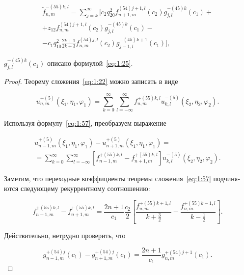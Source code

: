 \begin{russian}
\begin{theorem}
\begin{multline}\label{eq:1:56}
\tilde f_{n,m}^{ - (55)k,l} = \sum\limits_{j = k}^\infty  \bigg[ {c_2}q_{20}^2f_{n + 1,m}^{(54)j + 1,l}({c_2})g_{j,l}^{ - (45)k}({c_1}) + \\ 
+ {z_{12}}f_{n,m}^{(54)j + 1,l}({c_2})g_{j,l}^{ - (45)k}({c_1}) - \\
- {c_1}q_{10}^2\frac{{2k + 1}}{{2k + 3}}f_{n,m}^{(54)j,l}({c_2})g_{j - 1,l}^{ - (45)k + 1}({c_1}) \bigg],
\end{multline}

\noindent $g_{j,l}^{ - (45)k}({c_1})$ описано формулой~\eqref{eq:1:25}.
\end{theorem}

\begin{proof}
Теорему сложения~\eqref{eq:1:22} можно записать в виде

\begin{equation}\label{eq:1:57}
u_{n,m}^{ + (5)}\left( {{\xi _1},{\eta _1},{\varphi _1}} \right) = \sum\limits_{k = 0}^\infty  {\sum\limits_{l =  - \infty }^\infty  {f_{n,m}^{ + (55)k,l}} } u_{k,l}^{ - (5)}\left( {{\xi _2},{\eta _2},{\varphi _2}} \right).
\end{equation}

Используя формулу~\eqref{eq:1:57}, преобразуем выражение

\begin{multline}\label{eq:1:58}
u_{n - 1,m}^{ + (5)}\left( {{\xi _1},{\eta _1},{\varphi _1}} \right) - u_{n + 1,m}^{ + (5)}\left( {{\xi _1},{\eta _1},{\varphi _1}} \right) = \\
= \sum\limits_{k = 0}^\infty  {\sum\limits_{l =  - \infty }^\infty  {\left[ {f_{n - 1,m}^{ + (55)k,l} - f_{n + 1,m}^{ + (55)k,l}} \right]} } u_{k,l}^{ - (5)}\left( {{\xi _2},{\eta _2},{\varphi _2}} \right).
\end{multline}

Заметим, что переходные коэффициенты теоремы сложения~\eqref{eq:1:57} подчиняются следующему рекуррентному соотношению:

\begin{equation}\label{eq:1:59}
f_{n - 1,m}^{ + (55)k,l} - f_{n + 1,m}^{ + (55)k,l} = \frac{{2n + 1}}{{{c_1}}}\frac{{{c_2}}}{2}\left[ {\frac{{f_{n,m}^{ + (55)k + 1,l}}}{{k + \frac{3}{2}}} - \frac{{f_{n,m}^{ + (55)k - 1,l}}}{{k - \frac{1}{2}}}} \right].
\end{equation}

Действительно, нетрудно проверить, что

\begin{equation}\label{eq:1:60}
g_{n - 1,m}^{ + (54)j}({c_1}) - g_{n + 1,m}^{ + (54)j}({c_1}) = \frac{{2n + 1}}{{{c_1}}}g_{n,m}^{ + (54)j + 1}({c_1}).
\end{equation}


\end{proof}
\end{russian}
